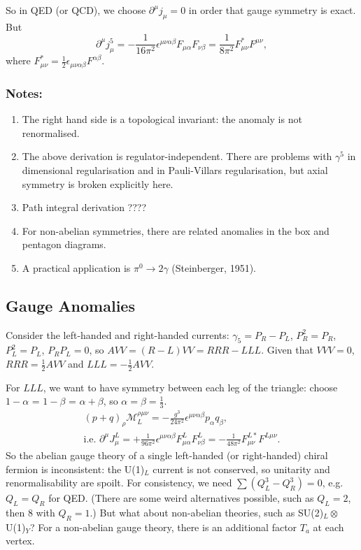 So in QED (or QCD), we choose $\partial^\mu j_\mu = 0$ in order that gauge symmetry is exact. But 
\begin{equation}
\partial^\mu j_\mu^5 = - \frac{1}{16 \pi^2} \epsilon^{\mu \nu \alpha \beta} F_{\mu \alpha} F_{\nu \beta} = \frac{1}{8 \pi^2} F_{\mu \nu}^* F^{\mu \nu},
\end{equation}
where $F_{\mu \nu}^* = \frac{1}{2} \epsilon_{\mu \nu \alpha \beta} F^{\alpha \beta}$.
\subsubsection{Notes:}
\begin{enumerate}
\item The right hand side is a topological invariant: the anomaly is not renormalised.
\item The above derivation is regulator-independent. There are problems with $\gamma^5$ in dimensional regularisation and in Pauli-Villars regularisation, but axial symmetry is broken explicitly here.
\item Path integral derivation ????
\item For non-abelian symmetries, there are related anomalies in the box and pentagon diagrams.
\item A practical application is $\pi^0 \to 2\gamma$ (Steinberger, 1951).
\end{enumerate}
%
\subsection{Gauge Anomalies}
%
Consider the left-handed and right-handed currents: $\gamma_5 = P_R - P_L$, $P_R^2=P_R$, $P_L^2=P_L$, $P_RP_L=0$, so $AVV = (R-L)VV = RRR - LLL$. Given that $VVV=0$, $RRR = \frac{1}{2}AVV$ and $LLL = -\frac{1}{2}AVV$.

For $LLL$, we want to have symmetry between each leg of the triangle: choose $1-\alpha$ = $1-\beta$ = $\alpha + \beta$, so $\alpha=\beta=\frac{1}{3}$.
\begin{equation}
\begin{split}
(p+q)_\rho \mathcal{M}_L^{\rho \mu \nu} = - \frac{g^3}{24\pi^2} \epsilon^{\mu \nu \alpha \beta} p_\alpha q_\beta, \\
\text{i.e. } \partial^\mu J_\mu^L = + \frac{1}{96\pi^2}\epsilon^{\mu \nu \alpha \beta}F_{\mu \alpha}^L F_{\nu \beta}^L = - \frac{1}{48 \pi^2}F_{\mu \nu}^{L *} F^{L \mu \nu}.
\end{split}
\end{equation}
So the abelian gauge theory of a single left-handed (or right-handed) chiral fermion is inconsistent: the U(1)$_L$ current is not conserved, so unitarity and renormalisability are spoilt. For consistency, we need $\sum (Q_L^3 - Q_R^3)=0$, e.g. $Q_L=Q_R$ for QED. (There are some weird alternatives possible, such as $Q_L=2$, then 8  with $Q_R=1$.) But what about non-abelian theories, such as SU(2)$_L \otimes$U(1)$_Y$? For a non-abelian gauge theory, there is an additional factor $T_a$ at each vertex.